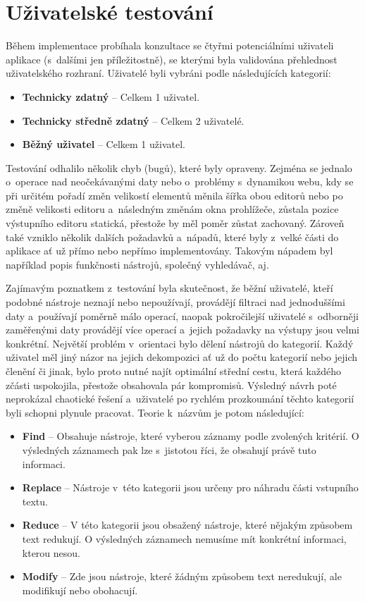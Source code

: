 \section{Uživatelské testování}
Během implementace probíhala konzultace se čtyřmi potenciálními uživateli aplikace (s~dalšími jen příležitostně), se kterými byla validována přehlednost uživatelského rozhraní. Uživatelé byli vybráni podle následujících kategorií:
\begin{itemize}
    \item \textbf{Technicky zdatný} -- Celkem 1 uživatel.
    \item \textbf{Technicky středně zdatný} -- Celkem 2 uživatelé.
    \item \textbf{Běžný uživatel} -- Celkem 1 uživatel.
\end{itemize}
Testování odhalilo několik chyb (bugů), které byly opraveny. Zejména se jednalo o~operace nad neočekávanými daty nebo o~problémy s~dynamikou webu, kdy se při určitém pořadí změn velikostí elementů měnila šířka obou editorů nebo po změně velikosti editoru a~následným změnám okna prohlížeče, zůstala pozice výstupního editoru statická, přestože by měl poměr zůstat zachovaný. Zároveň také vzniklo několik dalších požadavků a~nápadů, které byly z~velké části do aplikace ať už přímo nebo nepřímo implementovány. Takovým nápadem byl například popis funkčnosti nástrojů, společný vyhledávač, aj.

Zajímavým poznatkem z~testování byla skutečnost, že běžní uživatelé, kteří podobné nástroje neznají nebo nepoužívají, provádějí filtraci nad jednoduššími daty a~používají poměrně málo operací, naopak pokročilejší uživatelé s~odborněji zaměřenými daty provádějí více operací a~jejich požadavky na výstupy jsou velmi konkrétní. Největší problém v~orientaci bylo dělení nástrojů do kategorií. Každý uživatel měl jiný názor na jejich dekompozici ať už do počtu kategorií nebo jejich členění či jinak, bylo proto nutné najít optimální střední cestu, která každého zčásti uspokojila, přestože obsahovala pár kompromisů. Výsledný návrh poté neprokázal chaotické řešení a~uživatelé po rychlém prozkoumání těchto kategorií byli schopni plynule pracovat. Teorie k~názvům je potom následující:
\begin{itemize}
    \item \textbf{Find} -- Obsahuje nástroje, které vyberou záznamy podle zvolených kritérií. O výsledných záznamech pak lze s~jistotou říci, že obsahují právě tuto informaci.
    \item \textbf{Replace} -- Nástroje v~této kategorii jsou určeny pro náhradu části vstupního textu.
    \item \textbf{Reduce} -- V této kategorii jsou obsažený nástroje, které nějakým způsobem text redukují. O výsledných záznamech nemusíme mít konkrétní informaci, kterou nesou.
    \item \textbf{Modify} -- Zde jsou nástroje, které žádným způsobem text neredukují, ale modifikují nebo obohacují.
\end{itemize}

